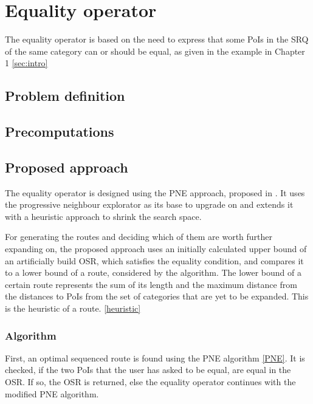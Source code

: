 \section{Equality operator}
The equality operator is based on the need to express that some PoIs in the SRQ of the same category can or should be equal, as given in the example in Chapter 1 \ref{sec:intro}

\subsection{Problem definition} 
\label{sec:problem}

\subsection{Precomputations} 
\label{sec:precomp}

\subsection{Proposed approach} 
\label{sec:approach}
The equality operator is designed using the PNE approach, proposed in \cite{OSR}. It uses the progressive neighbour explorator as  its base to upgrade on and extends it with a heuristic approach to shrink the search space. \newline

For generating the routes and deciding which of them are worth further expanding on, the proposed approach uses an initially calculated upper bound of an artificially build OSR, which satisfies the equality condition, and compares it to a lower bound of a route, considered by the algorithm. The lower bound of a certain route represents the sum of its length and the maximum distance from the distances to PoIs from the set of categories that are yet to be expanded. This is the heuristic of a route. \ref{heuristic}

\subsubsection{Algorithm}
\label{sec:algortihm}
First, an optimal sequenced route is found using the PNE algorithm \ref{PNE}. It is checked, if the two PoIs that the user has asked to be equal, are equal in the OSR. If so, the OSR is returned, else the equality operator continues with the modified PNE algorithm.

